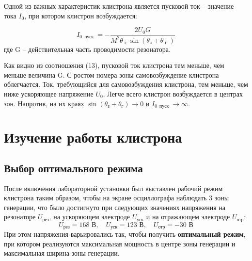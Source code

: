 \documentclass[a4paper,14pt]{extarticle}
\begin{document}
Одной из важных характеристик клистрона является пусковой ток -- значение тока $I_0$, при котором клистрон возбуждается:

\begin{equation}
  I _ { 0 \, \text { пуск } } = - \frac { 2 U _ { 0 } G } { M ^ { 2 } 
  \theta _ { \text{ г } } \sin \left( \theta _ { \text{з} } + \theta _ { \text{ г } } \right) }
\end{equation} где G -- действительная часть проводимости резонатора.

Как видно из соотношения (13), пусковой ток клистрона тем меньше, чем меньше величина G. С ростом номера зоны самовозбуждение клистрона облегчается. Ток, требующийся для самовозбуждения клистрона, тем меньше, чем ниже ускоряющее напряжение $U_0$. Легче всего клистрон возбуждается в центрах зон. Напротив, на их краях 
$\sin \left( \theta _ { \text{з} } + \theta _ { \text{г} } \right) \rightarrow 0$ и 
$I _ { 0\, \text { пуск } } \rightarrow \infty$.









\section{Изучение работы клистрона}
\subsection{Выбор оптимального режима}
После включения лабораторной установки был выставлен рабочий режим клистрона таким образом, чтобы на экране осциллографа наблюдать 3 зоны генерации, что было достигнуто при следующих значениях напряжения на резонаторе $U_\text{рез}$, на ускоряющем электроде $U_\text{уск}$ и на отражающем электроде $U_\text{отр}$:
\begin{equation}
    U_\text{рез} = 168 \text{ В},\quad
    U_\text{уск} = 123 \text{ В},\quad
    U_\text{отр} = -30 \text{ В}
\end{equation}
При этом напряжения варьировались так, чтобы получить \textbf{оптимальный режим}, при котором реализуются максимальная мощность в центре зоны генерации и максимальная ширина зоны генерации.
\end{document}

